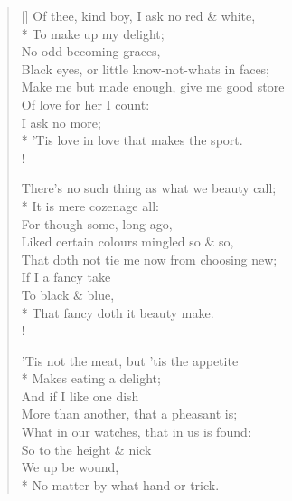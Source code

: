 \documentclass[MAIN]{subfiles}
\begin{document}
\settowidth{\versewidth}{Of thee, kind boy, I ask no red \& white,}
\begin{verse}[\versewidth]
Of thee, kind boy, I ask no red \& white,\\*
\vin To make up my delight;\\
\vin No odd becoming graces,\\
Black eyes, or little know-not-whats in faces;\\
Make me but made enough, give me good store\\
Of love for her I count:\\
\vin I ask no more;\\*
'Tis love in love that makes the sport.\\!

There's no such thing as what we beauty call;\\*
\vin It is mere cozenage all:\\
\vin For though some, long ago,\\
Liked certain colours mingled so \& so,\\
That doth not tie me now from choosing new;\\
If I a fancy take\\
\vin To black \& blue,\\*
That fancy doth it beauty make.\\!

'Tis not the meat, but 'tis the appetite\\*
\vin Makes eating a delight;\\
\vin And if I like one dish\\
More than another, that a pheasant is;\\
What in our watches, that in us is found:\\
So to the height \& nick\\
\vin We up be wound,\\*
No matter by what hand or trick.
\end{verse}
\end{document}
